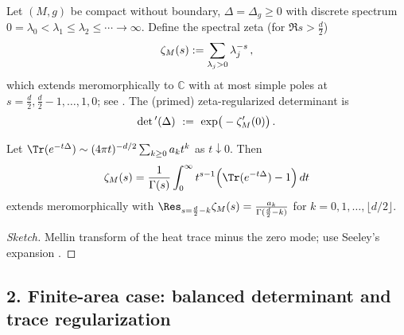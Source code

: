Let $(M,g)$ be compact without boundary, $\Delta=\Delta_g\ge 0$ with discrete spectrum $0=\lambda_0<\lambda_1\le \lambda_2\le\cdots\to\infty$. \relax\hspace{0pt}
Define the spectral zeta (for $\Re s>\tfrac{d}{2}$)
\begin{equation}\relax\hspace{0pt}
\label{eq:tfc7-zetaM}\relax\hspace{0pt}
\zeta_M(s):=\sum_{\lambda_j>0}\lambda_j^{-s}\,,
\end{equation}
which extends meromorphically to $\mathbb{C}$ with at most simple poles at $s=\tfrac{d}{2},\tfrac{d}{2}-1,\dots,1,0$; see \cite{MinakshisundaramPleijel,Seeley}. \relax\hspace{0pt}
The (primed) zeta-regularized determinant is
\begin{equation}\relax\hspace{0pt}
\label{eq:tfc7-det-compact}\relax\hspace{0pt}
\det{}'(\Delta)\ :=\ \exp\!\big(-\zeta_M'(0)\big)\,.
\end{equation}

\begin{theorem}\relax\hspace{0pt}
\label{thm:tfc7-heat-zeta}\relax\hspace{0pt}
Let $\Tr(e^{-t\Delta})\sim (4\pi t)^{-d/2}\sum_{k\ge 0}a_k t^k$ as $t\downarrow 0$. Then
\[
\zeta_M(s)=\frac{1}{\Gamma(s)}\int_0^\infty t^{s-1}\Big(\Tr(e^{-t\Delta})-1\Big)\,dt
\]
extends meromorphically with $\Res_{s=\frac{d}{2}-k}\zeta_M(s)=\frac{a_k}{\Gamma(\frac{d}{2}-k)}$ for $k=0,1,\dots,\lfloor d/2\rfloor$. \relax\hspace{0pt}
\end{theorem}

\begin{proof}[Sketch]\relax\hspace{0pt}
Mellin transform of the heat trace minus the zero mode; use Seeley's expansion \cite{Seeley}. \relax\hspace{0pt}
\end{proof}

\subsection*{2. Finite-area case: balanced determinant and trace regularization}\relax\hspace{0pt}
\label{subsec:tfc7-finite} %

